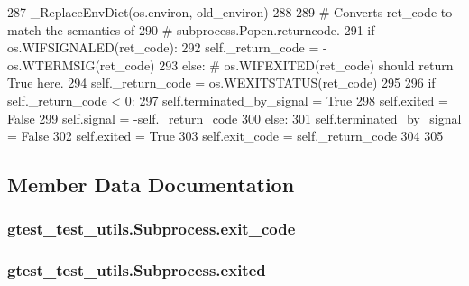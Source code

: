 \begin{DoxyCode}
287           \_ReplaceEnvDict(os.environ, old\_environ)
288 
289       \textcolor{comment}{# Converts ret\_code to match the semantics of}
290       \textcolor{comment}{# subprocess.Popen.returncode.}
291       \textcolor{keywordflow}{if} os.WIFSIGNALED(ret\_code):
292         self.\_return\_code = -os.WTERMSIG(ret\_code)
293       \textcolor{keywordflow}{else}:  \textcolor{comment}{# os.WIFEXITED(ret\_code) should return True here.}
294         self.\_return\_code = os.WEXITSTATUS(ret\_code)
295 
296     \textcolor{keywordflow}{if} self.\_return\_code < 0:
297       self.terminated\_by\_signal = \textcolor{keyword}{True}
298       self.exited = \textcolor{keyword}{False}
299       self.signal = -self.\_return\_code
300     \textcolor{keywordflow}{else}:
301       self.terminated\_by\_signal = \textcolor{keyword}{False}
302       self.exited = \textcolor{keyword}{True}
303       self.exit\_code = self.\_return\_code
304 
305 
\end{DoxyCode}


\subsection{Member Data Documentation}
\subsubsection[{\texorpdfstring{exit\+\_\+code}{exit_code}}]{\setlength{\rightskip}{0pt plus 5cm}gtest\+\_\+test\+\_\+utils.\+Subprocess.\+exit\+\_\+code}\hypertarget{classgtest__test__utils_1_1Subprocess_a01acee4476fd01ccf017d1351cf46c08}{}\label{classgtest__test__utils_1_1Subprocess_a01acee4476fd01ccf017d1351cf46c08}
\subsubsection[{\texorpdfstring{exited}{exited}}]{\setlength{\rightskip}{0pt plus 5cm}gtest\+\_\+test\+\_\+utils.\+Subprocess.\+exited}\hypertarget{classgtest__test__utils_1_1Subprocess_a020b5fa8268b9eaf1c4a57cbd53c104d}{}\label{classgtest__test__utils_1_1Subprocess_a020b5fa8268b9eaf1c4a57cbd53c104d}
